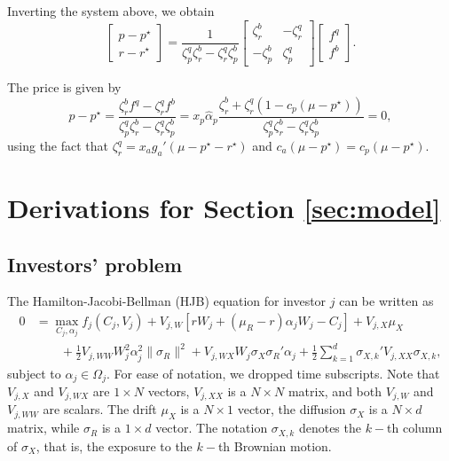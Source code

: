 Inverting the system above, we obtain
\begin{equation}
    \left[ 
    \begin{matrix}
        p-p^\star\\
        r-r^\star
    \end{matrix}
    \right] = 
    \frac{1}{\zeta_{p}^q \zeta^b_r - \zeta_r^q \zeta ^b_p } \left[
    \begin{matrix}
        \zeta^b_r  & -\zeta^q_r\\
        -\zeta_p^b & \zeta_p^q
    \end{matrix}
    \right] 
    \left[ 
    \begin{matrix}
        f^q\\
    f^b
    \end{matrix}
    \right].
\end{equation}

The price is given by 
\begin{equation}
    p-p^\star = \frac{\zeta_r^b f^q - \zeta_r^q f^b}{\zeta_{p}^q \zeta^b_r - \zeta_r^q \zeta ^b_p } = 
     x_p \hat{\alpha}_p\frac{\zeta_r^b  + \zeta_r^q (1-c_p(\mu-p^\star))}{\zeta_{p}^q \zeta^b_r - \zeta_r^q \zeta ^b_p } = 0,
\end{equation}
using the fact that $\zeta^q_r = x_a g_a'(\mu-p^\star-r^\star)$ and $c_a(\mu-p^\star) = c_p(\mu-p^\star)$.

\section{Derivations for Section \ref{sec:model}}

\subsection{Investors' problem}

The Hamilton-Jacobi-Bellman (HJB) equation for investor $j$ can be written as
\begin{align}
    0 &= \max_{C_j, \alpha_j} f_j(C_j,V_j) + V_{j,W}\left[ r W_j + (\mu_R-r) \alpha_j W_j  - C_j\right] +V_{j,X} \mu_X\nonumber\\
    &\qquad + \frac{1}{2} V_{j,WW} W_j^2 \alpha_j^2 \|\sigma_R\|^2 + V_{j,WX}W_j \sigma_X \sigma_R' \alpha_j    + \frac{1}{2} \sum_{k=1}^d \sigma_{X,k}' V_{j,XX} \sigma_{X,k},
\end{align}
subject to $\alpha_j \in \Omega_j$. For ease of notation, we dropped time subscripts. Note that  $V_{j,X}$ and $V_{j,WX}$ are $1\times N$ vectors, $V_{j,XX}$ is a $N\times N$ matrix, and both $V_{j,W}$ and $V_{j,WW}$ are scalars. The drift $\mu_X$ is a $N\times 1$ vector, the diffusion $\sigma_X$ is a $N\times d$ matrix, while $\sigma_R$ is a $1\times d$ vector. The notation $\sigma_{X,k}$ denotes the $k-$th column of $\sigma_{X}$, that is, the exposure to the $k-$th Brownian motion.

